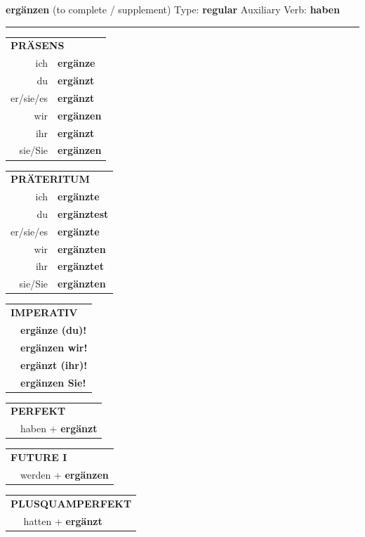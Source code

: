 \documentclass[10pt,a4paper]{revtex4-2}
\begin{document}
\begin{verbbox}
{\Large \bf ergänzen} (to complete / supplement) \hfill Type: \textbf{regular} \hfill Auxiliary Verb: \textbf{haben} 

\vspace{5pt}
\hrule
\vspace{5pt}

\begin{tabular}{rl}
\multicolumn{2}{l}{\textbf{PRÄSENS}}\\
ich & \textbf{ergänze}\\
du & \textbf{ergänzt}\\
er/sie/es & \textbf{ergänzt}\\
wir & \textbf{ergänzen}\\
ihr & \textbf{ergänzt}\\
sie/Sie & \textbf{ergänzen}\\
\end{tabular}
\hfill
\begin{tabular}{rl}
\multicolumn{2}{l}{\textbf{PRÄTERITUM}}\\
ich & \textbf{ergänzte}\\
du & \textbf{ergänztest}\\
er/sie/es & \textbf{ergänzte}\\
wir & \textbf{ergänzten}\\
ihr & \textbf{ergänztet}\\
sie/Sie & \textbf{ergänzten}\\
\end{tabular}
\hfill
\begin{tabular}{rl}
\multicolumn{2}{l}{\textbf{IMPERATIV}}\\
& \textbf{ergänze (du)!}\\
& \textbf{ergänzen wir!}\\
& \textbf{ergänzt (ihr)!}\\
& \textbf{ergänzen Sie!}\\
\end{tabular}

\vspace{10pt}

\begin{tabular}{rl}
\multicolumn{2}{l}{\textbf{PERFEKT}}\\
& haben + \textbf{ergänzt}\\
\end{tabular}
\hfill
\begin{tabular}{rl}
\multicolumn{2}{l}{\textbf{FUTURE I}}\\
& werden + \textbf{ergänzen}\\
\end{tabular}
\hfill
\begin{tabular}{rl}
\multicolumn{2}{l}{\textbf{PLUSQUAMPERFEKT}}\\
& hatten + \textbf{ergänzt}\\
\end{tabular}


\end{verbbox}
\end{document}
